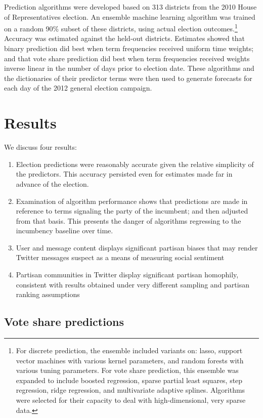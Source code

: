 \documentclass{acm_proc_article-sp}
\begin{document}
Prediction algorithms were developed based on 313 districts from the 2010 House of
Representatives election. An ensemble machine learning
algorithm \cite{van2007super} was trained on a random 90\% subset of
these districts, using actual election outcomes.\footnote{For discrete
  prediction, the ensemble
included variants on: lasso, support vector machines with various
kernel parameters, and random forests with various tuning
parameters. For vote share prediction, this ensemble was expanded to
include boosted regression, sparse partial least squares, step
regression, ridge regression, and multivariate adaptive splines. Algorithms were selected for their capacity to deal with
high-dimensional, very sparse data.} Accuracy was
estimated against the held-out districts. Estimates showed that binary
prediction did best when term frequencies received uniform time
weights; and that vote share prediction did best when term frequencies
received weights inverse linear in the number of days prior to
election date. These algorithms and the dictionaries of their
predictor terms were then used to generate forecasts for each day of
the 2012 general election campaign.

\section{Results}
\label{sec:results}

We discuss four results:
\begin{enumerate}
\item Election predictions were reasonably accurate given the relative
  simplicity of the predictors. This accuracy persisted even for
  estimates made far in advance of the election.
\item Examination of algorithm performance shows that predictions are
  made in reference to terms signaling the party of the incumbent; and
  then adjusted from that basis. This presents the danger of
  algorithms regressing to the incumbency baseline over time.
\item User and message content displays significant partisan biases
  that may render Twitter messages suspect as a means of measuring
  social sentiment
\item Partisan communities in Twitter display significant partisan
  homophily, consistent with results obtained under very different
  sampling and partisan ranking assumptions
\end{enumerate}

\subsection{Vote share predictions}
\label{sec:predictions}
\end{document}
